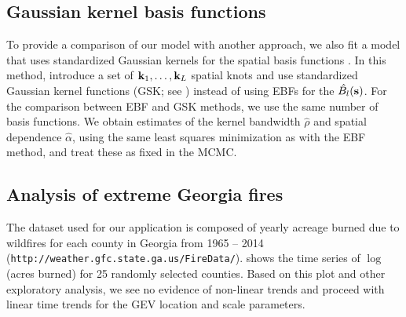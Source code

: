 \documentclass[11pt]{article}
\begin{document}
\subsection{Gaussian kernel basis functions}
To provide a comparison of our model with another approach, we also fit a model that uses standardized Gaussian kernels for the spatial basis functions \citep{Reich2012}.
In this method, \citeauthor{Reich2012} introduce a set of $\mbox{\bf k}_1, \ldots, \mbox{\bf k}_L$ spatial knots and use standardized Gaussian kernel functions (GSK; see ) instead of using EBFs for the $\hat{B_l}(\mbox{\bf s})$.
For the comparison between EBF and GSK methods, we use the same number of basis functions.
We obtain estimates of the kernel bandwidth $\hat{\rho}$ and spatial dependence $\hat{\alpha}$, using the same least squares minimization as with the EBF method, and treat these as fixed in the MCMC.

\subsection{Analysis of extreme Georgia fires}\label{ebs:georgia}
The dataset used for our application is composed of yearly acreage burned due to wildfires for each county in Georgia from 1965 -- 2014 (\texttt{http://weather.gfc.state.ga.us/FireData/}).
 shows the time series of $\log$(acres burned) for 25 randomly selected counties.
Based on this plot and other exploratory analysis, we see no evidence of non-linear trends and proceed with linear time trends for the GEV location and scale parameters.
\end{document}
